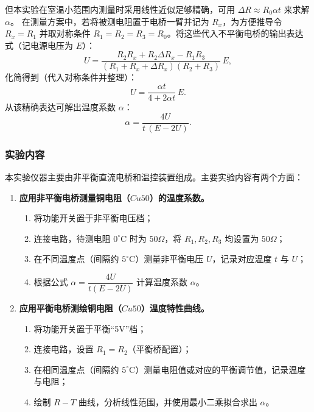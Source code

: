 \documentclass[]{../template/Report}%
\begin{document}
但本实验在室温小范围内测量时采用线性近似足够精确，可用 $\Delta R\approx R_0\alpha t$ 来求解 $\alpha$。
在测量方案中，若将被测电阻置于电桥一臂并记为 $R_x$，为方便推导令 $R_x=R_1$ 并取对称条件
$R_1=R_2=R_3=R_0$。将这些代入不平衡电桥的输出表达式（记电源电压为 $E$）：
\begin{equation}
U=\frac{R_2R_x+R_2\Delta R_x-R_1R_3}{(R_1+R_x+\Delta R_x)(R_2+R_3)}\,E,
\end{equation}
化简得到（代入对称条件并整理）：
\begin{equation}
U=\frac{\alpha t}{4+2\alpha t}\,E.
\end{equation}
从该精确表达可解出温度系数 $\alpha$：
\begin{equation}
\alpha=\frac{4U}{t\,(E-2U)}.
\end{equation}

\subsubsection{实验内容}
本实验仪器主要由非平衡直流电桥和温控装置组成。主要实验内容有两个方面：

\begin{enumerate}
    \item \textbf{应用非平衡电桥测量铜电阻（$Cu50$）的温度系数。}
    \begin{enumerate}[label=\roman*.]
        \item 将功能开关置于非平衡电压档；
        \item 连接电路，待测电阻 $0^{\circ}\mathrm{C}$ 时为 $50\Omega$，将 $R_1,R_2,R_3$ 均设置为 $50\Omega$；
        \item 在不同温度点（间隔约 $5^{\circ}\mathrm{C}$）测量非平衡电压 $U$，记录对应温度 $t$ 与 $U$；
        \item 根据公式 $\alpha=\dfrac{4U}{t(E-2U)}$ 计算温度系数 $\alpha$。
    \end{enumerate}

    \item \textbf{应用平衡电桥测绘铜电阻（$Cu50$）温度特性曲线。}
    \begin{enumerate}[label=\roman*.]
        \item 将功能开关置于平衡“5V”档；
        \item 连接电路，设置 $R_1=R_2$（平衡桥配置）；
        \item 在相同温度点（间隔约 $5^{\circ}\mathrm{C}$）测量电阻值或对应的平衡调节值，记录温度与电阻；
        \item 绘制 $R-T$ 曲线，分析线性范围，并使用最小二乘拟合求出 $\alpha$。
    \end{enumerate}
\end{enumerate}
\end{document}
